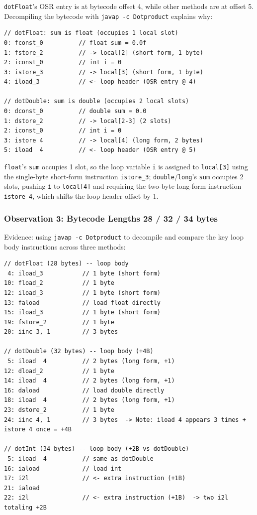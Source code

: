 \documentclass[12pt,a4paper]{article}
\begin{document}
\texttt{dotFloat}'s OSR entry is at bytecode offset 4, while other methods are at offset 5. Decompiling the bytecode with \texttt{javap -c Dotproduct} explains why:

\begin{lstlisting}
// dotFloat: sum is float (occupies 1 local slot)
0: fconst_0          // float sum = 0.0f
1: fstore_2          // -> local[2] (short form, 1 byte)
2: iconst_0          // int i = 0
3: istore_3          // -> local[3] (short form, 1 byte)
4: iload_3           // <- loop header (OSR entry @ 4)

// dotDouble: sum is double (occupies 2 local slots)
0: dconst_0          // double sum = 0.0
1: dstore_2          // -> local[2-3] (2 slots)
2: iconst_0          // int i = 0
3: istore 4          // -> local[4] (long form, 2 bytes)
5: iload  4          // <- loop header (OSR entry @ 5)
\end{lstlisting}

\texttt{float}'s \texttt{sum} occupies 1 slot, so the loop variable \texttt{i} is assigned to \texttt{local[3]} using the single-byte short-form instruction \texttt{istore\_3}; \texttt{double}/\texttt{long}'s \texttt{sum} occupies 2 slots, pushing \texttt{i} to \texttt{local[4]} and requiring the two-byte long-form instruction \texttt{istore 4}, which shifts the loop header offset by 1.

\subsubsection*{Observation 3: Bytecode Lengths 28 / 32 / 34 bytes}

Evidence: using \texttt{javap -c Dotproduct} to decompile and compare the key loop body instructions across three methods:

\begin{lstlisting}
// dotFloat (28 bytes) -- loop body
 4: iload_3           // 1 byte (short form)
10: fload_2           // 1 byte
12: iload_3           // 1 byte (short form)
13: faload            // load float directly
15: iload_3           // 1 byte (short form)
19: fstore_2          // 1 byte
20: iinc 3, 1         // 3 bytes

// dotDouble (32 bytes) -- loop body (+4B)
 5: iload  4          // 2 bytes (long form, +1)
12: dload_2           // 1 byte
14: iload  4          // 2 bytes (long form, +1)
16: daload            // load double directly
18: iload  4          // 2 bytes (long form, +1)
23: dstore_2          // 1 byte
24: iinc 4, 1         // 3 bytes  -> Note: iload 4 appears 3 times + istore 4 once = +4B

// dotInt (34 bytes) -- loop body (+2B vs dotDouble)
 5: iload  4          // same as dotDouble
16: iaload            // load int
17: i2l               // <- extra instruction (+1B)
21: iaload
22: i2l               // <- extra instruction (+1B)  -> two i2l totaling +2B
\end{lstlisting}
\end{document}
